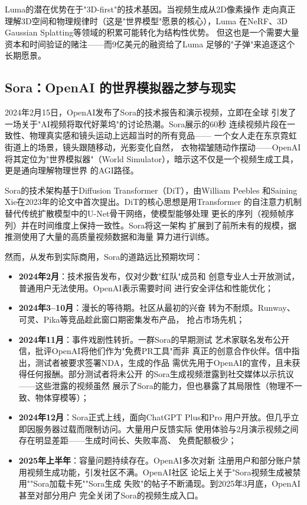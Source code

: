 Luma的潜在优势在于"3D-first"的技术基因。当视频生成从2D像素操作
走向真正理解3D空间和物理规律时（这是"世界模型"愿景的核心），Luma
在NeRF、3D Gaussian Splatting等领域的积累可能转化为结构性优势。
但这也是一个需要大量资本和时间验证的赌注——而9亿美元的融资给了Luma
足够的"子弹"来追逐这个长期愿景。

\subsection{Sora：OpenAI 的世界模拟器之梦与现实}
\label{subsec:sora}

2024年2月15日，OpenAI发布了Sora的技术报告和演示视频，立即在全球
引发了一场关于"AI视频将取代好莱坞"的讨论热潮。Sora展示的60秒
连续视频片段在一致性、物理真实感和镜头运动上远超当时的所有竞品——
一个女人走在东京霓虹街道上的场景，镜头跟随移动，光影变化自然，
衣物褶皱随动作摆动——OpenAI将其定位为"世界模拟器"（World
Simulator），暗示这不仅是一个视频生成工具，更是通向理解物理世界
的AGI路径。

Sora的技术架构基于Diffusion Transformer（DiT），由William Peebles
和Saining Xie在2023年的论文中首次提出。DiT的核心思想是用Transformer
的自注意力机制替代传统扩散模型中的U-Net骨干网络，使模型能够处理
更长的序列（视频帧序列）并在时间维度上保持一致性。Sora将这一架构
扩展到了前所未有的规模，据推测使用了大量的高质量视频数据和海量
算力进行训练。

然而，从发布到实际商用，Sora的道路远比预期坎坷：

\begin{itemize}
  \item \textbf{2024年2月}：技术报告发布，仅对少数"红队"成员和
    创意专业人士开放测试，普通用户无法使用。OpenAI表示需要时间
    进行安全评估和性能优化；
  \item \textbf{2024年3--10月}：漫长的等待期。社区从最初的兴奋
    转为不耐烦。Runway、可灵、Pika等竞品趁此窗口期密集发布产品，
    抢占市场先机；
  \item \textbf{2024年11月}：事件戏剧性转折。一群Sora的早期测试
    艺术家联名发布公开信，批评OpenAI将他们作为"免费PR工具"而非
    真正的创意合作伙伴。信中指出，测试者被要求签署NDA，生成的作品
    需优先用于OpenAI的宣传，且未获得任何报酬。部分测试者将未公开
    的Sora生成视频泄露到社交媒体以示抗议——这些泄露的视频虽然
    展示了Sora的能力，但也暴露了其局限性（物理不一致、物体穿模等）；
  \item \textbf{2024年12月}：Sora正式上线，面向ChatGPT Plus和Pro
    用户开放。但几乎立即因服务器过载而限制访问。大量用户反馈实际
    使用体验与2月演示视频之间存在明显差距——生成时间长、失败率高、
    免费配额极少；
  \item \textbf{2025年上半年}：容量问题持续存在。OpenAI多次对新
    注册用户和部分账户禁用视频生成功能，引发社区不满。OpenAI社区
    论坛上关于"Sora视频生成被禁用""Sora加载卡死""Sora生成
    失败"的帖子不断涌现。到2025年3月底，OpenAI甚至对部分用户
    完全关闭了Sora的视频生成入口。
\end{itemize}

